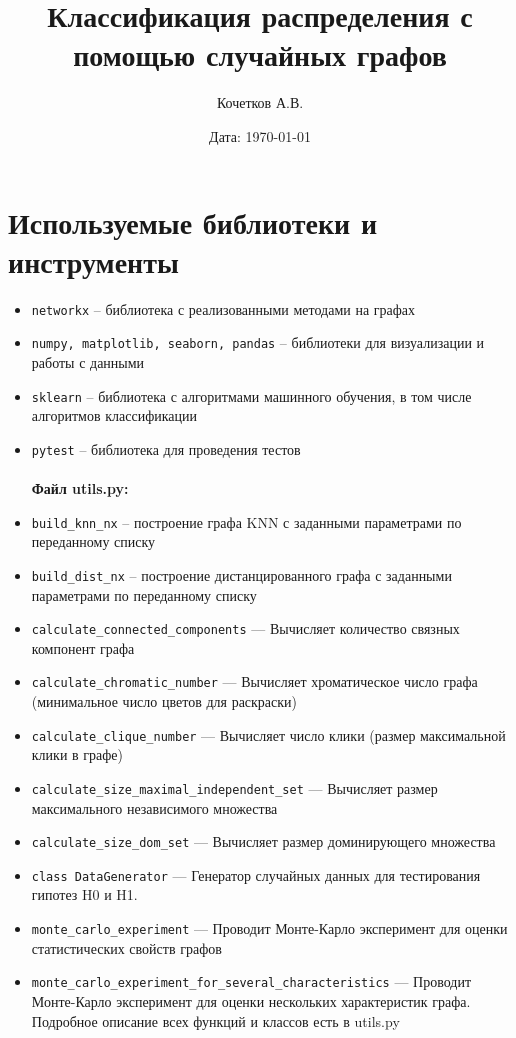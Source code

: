 \documentclass[a4paper,12pt]{article}
\title{\textbf{Классификация распределения с помощью случайных графов}}
\author{Кочетков А.В.}
\date{Дата: \today}
\begin{document}
\maketitle


\section{Используемые библиотеки и инструменты}

\begin{itemize}
    \item \texttt{networkx} -- библиотека с реализованными методами на графах
    \item \texttt{numpy, matplotlib, seaborn, pandas} -- библиотеки для визуализации и работы с данными
    \item \texttt{sklearn} -- библиотека с алгоритмами машинного обучения, в том числе алгоритмов классификации
    \item \texttt{pytest} -- библиотека для проведения тестов 
    \\
    \\
    \textbf{Файл utils.py:}
    \item \texttt{build\_knn\_nx} -- построение графа KNN с заданными параметрами по переданному списку 
    
    \item \texttt{build\_dist\_nx} -- построение дистанцированного графа с заданными параметрами по переданному списку 
    
    \item \texttt{calculate\_connected\_components} --- Вычисляет количество связных компонент графа
    \item \texttt{calculate\_chromatic\_number} --- Вычисляет хроматическое число графа (минимальное число цветов для раскраски)
    \item \texttt{calculate\_clique\_number} --- Вычисляет число клики (размер максимальной клики в графе)
    \item \texttt{calculate\_size\_maximal\_independent\_set} --- Вычисляет размер максимального независимого множества
    \item \texttt{calculate\_size\_dom\_set} --- Вычисляет размер доминирующего множества
    \item \texttt{class DataGenerator} --- Генератор случайных данных для тестирования гипотез H0 и H1.
    \item \texttt{monte\_carlo\_experiment} --- Проводит Монте-Карло эксперимент для оценки статистических свойств графов
    \item \texttt{monte\_carlo\_experiment\_for\_several\_characteristics} --- Проводит Монте-Карло эксперимент для оценки нескольких характеристик графа.
\\
    Подробное описание всех функций и классов есть в utils.py
    
    
\end{itemize}
\end{document}
